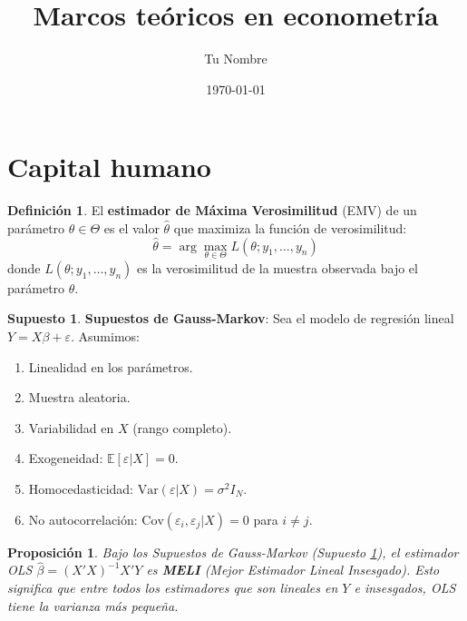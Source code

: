\documentclass[12pt, a4paper]{article}
\title{Marcos teóricos en econometría}
\author{Tu Nombre}
\date{\today}
\newtheorem{proposition}[theorem]{Proposición}
\theoremstyle{definition}
\newtheorem{definition}{Definición}[section]
\newtheorem{assumption}{Supuesto}
\theoremstyle{remark}
\begin{document}
\maketitle

\section{Capital humano}

\begin{definition}
  El \textbf{estimador de Máxima Verosimilitud} (EMV) de un parámetro 
  $\theta \in \Theta$ es el valor $\hat{\theta}$ que maximiza la función 
  de verosimilitud:
  \[
    \hat{\theta} = \arg\max_{\theta \in \Theta} L(\theta; y_1, \ldots, y_n)
  \]
  donde $L(\theta; y_1, \ldots, y_n)$ es la verosimilitud de la muestra 
  observada bajo el parámetro $\theta$.
\end{definition}

\begin{assumption}
  \label{ass:gauss_markov}
  \textbf{Supuestos de Gauss-Markov}: Sea el modelo de regresión lineal 
  $Y = X\beta + \varepsilon$. Asumimos:
  \begin{enumerate}
    \item Linealidad en los parámetros.
    \item Muestra aleatoria.
    \item Variabilidad en $X$ (rango completo).
    \item Exogeneidad: $\mathbb{E}[\varepsilon | X] = 0$.
    \item Homocedasticidad: $\text{Var}(\varepsilon | X) = \sigma^2 I_N$.
    \item No autocorrelación: $\text{Cov}(\varepsilon_i, \varepsilon_j | X) = 0$ 
          para $i \neq j$.
  \end{enumerate}
\end{assumption}

\begin{proposition}
  \label{prop:ols_meli}
  Bajo los Supuestos de Gauss-Markov (Supuesto \ref{ass:gauss_markov}), 
  el estimador OLS $\hat{\beta} = (X'X)^{-1}X'Y$ es \textbf{MELI} 
  (Mejor Estimador Lineal Insesgado). Esto significa que entre todos los 
  estimadores que son lineales en $Y$ e insesgados, OLS tiene la varianza 
  más pequeña.
\end{proposition}
\end{document}
